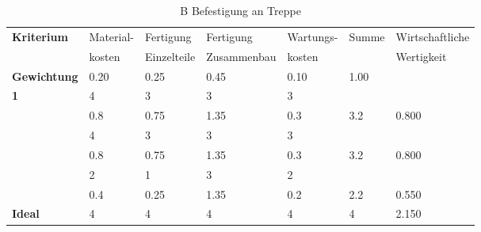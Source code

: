 \documentclass[10pt,a4paper]{article}
\begin{document}
\begin{table}[h!]
    \centering
    \hspace*{0in}
    \begin{tabular}{>{\bfseries}p{2cm} p{2.2cm} p{2cm} p{2cm} p{2.5cm} p{2cm} p{2cm}}
        \toprule
        Kriterium  & Material- & Fertigung   & Fertigung   & Wartungs- & Summe & Wirtschaftliche \\
                   & kosten    & Einzelteile & Zusammenbau & kosten    &       & Wertigkeit      \\
        \midrule
        Gewichtung & 0.20      & 0.25        & 0.45        & 0.10      & 1.00  &                 \\
        \midrule
        1          & 4         & 3           & 3           & 3         &       &                 \\
                   & 0.8       & 0.75        & 1.35        & 0.3       & 3.2   & 0.800           \\
        \addlinespace
        2          & 4         & 3           & 3           & 3         &       &                 \\
                   & 0.8       & 0.75        & 1.35        & 0.3       & 3.2   & 0.800           \\
        \addlinespace
        3          & 2         & 1           & 3           & 2         &       &                 \\
                   & 0.4       & 0.25        & 1.35        & 0.2       & 2.2   & 0.550           \\
        \addlinespace
        Ideal      & 4         & 4           & 4           & 4         & 4     & 2.150           \\
        \bottomrule
    \end{tabular}
    \caption{B Befestigung an Treppe}
    \label{tab:befestigung_treppe}
\end{table}
\end{document}
